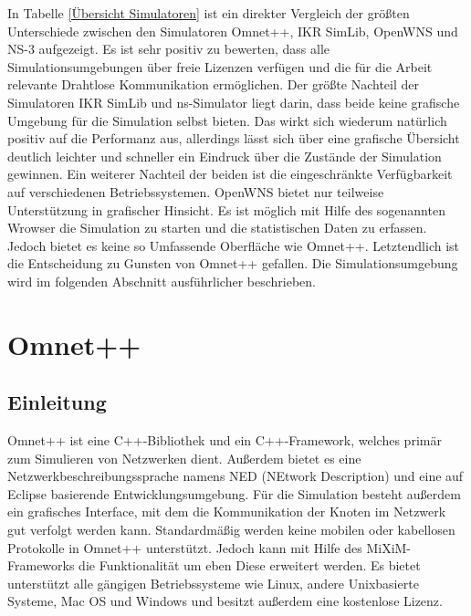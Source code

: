 In Tabelle \ref{Übersicht Simulatoren} ist ein direkter Vergleich der größten Unterschiede zwischen den Simulatoren Omnet++, IKR SimLib, OpenWNS und NS-3 aufgezeigt. Es ist sehr positiv zu bewerten, dass alle Simulationsumgebungen über freie Lizenzen verfügen und die für die Arbeit relevante Drahtlose Kommunikation ermöglichen.\newline
Der größte Nachteil der Simulatoren IKR SimLib und ns-Simulator liegt darin, dass beide keine grafische Umgebung für die Simulation selbst bieten. Das wirkt sich wiederum natürlich positiv auf die Performanz aus, allerdings lässt sich über eine grafische Übersicht deutlich leichter und schneller ein Eindruck über die Zustände der Simulation gewinnen. Ein weiterer Nachteil der beiden ist die eingeschränkte Verfügbarkeit auf verschiedenen Betriebssystemen. \newline
OpenWNS bietet nur teilweise Unterstützung in grafischer Hinsicht. Es ist möglich mit Hilfe des sogenannten Wrowser die Simulation zu starten und die statistischen Daten zu erfassen. Jedoch bietet es keine so Umfassende Oberfläche wie Omnet++. \newline
Letztendlich ist die Entscheidung zu Gunsten von Omnet++ gefallen. Die Simulationsumgebung wird im folgenden Abschnitt ausführlicher beschrieben.

\section{Omnet++}

\subsection{Einleitung}

Omnet++\cite{omnet} ist eine C++-Bibliothek und ein C++-Framework, welches primär zum Simulieren von Netzwerken dient. Außerdem bietet es eine Netzwerkbeschreibungssprache namens NED (NEtwork Description) und eine auf Eclipse\cite{eclipse} basierende Entwicklungsumgebung. Für die Simulation besteht außerdem ein grafisches Interface, mit dem die Kommunikation der Knoten im Netzwerk gut verfolgt werden kann.
\newline Standardmäßig werden keine mobilen oder kabellosen Protokolle in Omnet++ unterstützt. Jedoch kann mit Hilfe des MiXiM-Frameworks die Funktionalität um eben Diese erweitert werden.
\newline Es bietet unterstützt alle gängigen Betriebssysteme wie Linux, andere Unixbasierte Systeme, Mac OS und Windows und besitzt außerdem eine kostenlose Lizenz.

